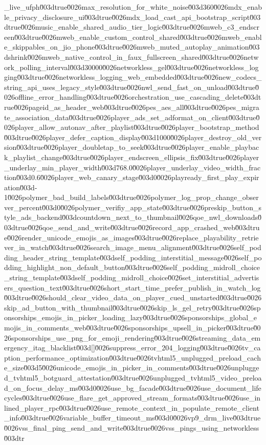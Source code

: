 {_live_ufph\u003dtrue\u0026max_resolution_for_white_noise\u003d360\u0026mdx_enable_privacy_disclosure_ui\u003dtrue\u0026mdx_load_cast_api_bootstrap_script\u003dtrue\u0026music_enable_shared_audio_tier_logic\u003dtrue\u0026mweb_c3_endscreen\u003dtrue\u0026mweb_enable_custom_control_shared\u003dtrue\u0026mweb_enable_skippables_on_jio_phone\u003dtrue\u0026mweb_muted_autoplay_animation\u003dshrink\u0026mweb_native_control_in_faux_fullscreen_shared\u003dtrue\u0026network_polling_interval\u003d30000\u0026networkless_gel\u003dtrue\u0026networkless_logging\u003dtrue\u0026networkless_logging_web_embedded\u003dtrue\u0026new_codecs_string_api_uses_legacy_style\u003dtrue\u0026nwl_send_fast_on_unload\u003dtrue\u0026offline_error_handling\u003dtrue\u0026orchestration_use_cascading_delete\u003dtrue\u0026pageid_as_header_web\u003dtrue\u0026pes_aes_all\u003dtrue\u0026pes_migrate_association_data\u003dtrue\u0026player_ads_set_adformat_on_client\u003dtrue\u0026player_allow_autonav_after_playlist\u003dtrue\u0026player_bootstrap_method\u003dtrue\u0026player_defer_caption_display\u003d1000\u0026player_destroy_old_version\u003dtrue\u0026player_doubletap_to_seek\u003dtrue\u0026player_enable_playback_playlist_change\u003dtrue\u0026player_endscreen_ellipsis_fix\u003dtrue\u0026player_underlay_min_player_width\u003d768.0\u0026player_underlay_video_width_fraction\u003d0.6\u0026player_web_canary_stage\u003d0\u0026playready_first_play_expiration\u003d-1\u0026polymer_bad_build_labels\u003dtrue\u0026polymer_log_prop_change_observer_percent\u003d0\u0026polymer_verifiy_app_state\u003dtrue\u0026preskip_button_style_ads_backend\u003dcountdown_next_to_thumbnail\u0026qoe_nwl_downloads\u003dtrue\u0026qoe_send_and_write\u003dtrue\u0026record_app_crashed_web\u003dtrue\u0026render_unicode_emojis_as_images\u003dtrue\u0026replace_playability_retriever_in_watch\u003dtrue\u0026search_image_menu_alignment\u003dtrue\u0026self_podding_header_string_template\u003dself_podding_interstitial_message\u0026self_podding_highlight_non_default_button\u003dtrue\u0026self_podding_midroll_choice_string_template\u003dself_podding_midroll_choice\u0026set_interstitial_advertisers_question_text\u003dtrue\u0026short_start_time_prefer_publish_in_watch_log\u003dtrue\u0026should_clear_video_data_on_player_cued_unstarted\u003dtrue\u0026skip_ad_button_with_thumbnail\u003dtrue\u0026skip_ls_gel_retry\u003dtrue\u0026sponsorships_emojis_in_picker_loading_lazy\u003dtrue\u0026sponsorships_global_emojis_in_comments_web\u003dtrue\u0026sponsorships_upsell_in_picker\u003dtrue\u0026sponsorships_use_png_for_emoji_rendering\u003dtrue\u0026streaming_data_emergency_itag_blacklist\u003d[]\u0026suppress_error_204_logging\u003dtrue\u0026tv_caption_performance_optimization\u003dtrue\u0026tvhtml5_unplugged_preload_cache_size\u003d5\u0026unicode_emojis_in_picker_in_comments\u003dtrue\u0026unplugged_tvhtml5_botguard_attestation\u003dtrue\u0026unplugged_tvhtml5_video_preload_on_focus_delay_ms\u003d0\u0026use_bg_facade\u003dtrue\u0026use_document_lifecycles\u003dtrue\u0026use_flare_get_approved_stream_formats\u003dtrue\u0026use_inlined_player_rpc\u003dtrue\u0026use_remote_context_in_populate_remote_client_info\u003dtrue\u0026variable_buffer_timeout_ms\u003d0\u0026vp9_drm_live\u003dtrue\u0026vss_final_ping_send_and_write\u003dtrue\u0026vss_pings_using_networkless\u003dtr}
